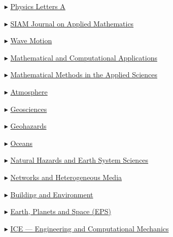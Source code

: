 \begin{itemize}
    \item[$\blacktriangleright$] \href{http://www.journals.elsevier.com/physics-letters-a/}{Physics Letters A}
    
    \item[$\blacktriangleright$] \href{http://www.siam.org/journals/siap.php}{SIAM Journal on Applied Mathematics}
  
    \item[$\blacktriangleright$] \href{http://www.elsevier.com/locate/wavemoti}%
    {Wave Motion}
    
    \item[$\blacktriangleright$] \href{https://www.mdpi.com/journal/mca}{Mathematical and Computational Applications}
    
    \item[$\blacktriangleright$] \href{https://onlinelibrary.wiley.com/journal/10991476/}{Mathematical Methods in the Applied Sciences}

    \item[$\blacktriangleright$] \href{https://www.mdpi.com/journal/atmosphere/}{Atmosphere}
    
    \item[$\blacktriangleright$] \href{https://www.mdpi.com/journal/geosciences/}{Geosciences}

    \item[$\blacktriangleright$] \href{https://www.mdpi.com/journal/geohazards/}{Geohazards}

    \item[$\blacktriangleright$] \href{https://www.mdpi.com/journal/oceans/}{Oceans}
    
    \item[$\blacktriangleright$] \href{http://www.nat-hazards-earth-syst-sci.net/}%
    {Natural Hazards and Earth System Sciences}

    \item[$\blacktriangleright$] \href{https://www.aimspress.com/journal/nhm/}{Networks and Heterogeneous Media}

    \item[$\blacktriangleright$] \href{https://www.sciencedirect.com/journal/building-and-environment}%
    {Building and Environment}
    
    \item[$\blacktriangleright$] \href{http://www.terrapub.co.jp/journals/EPS/}{Earth, Planets and Space (EPS)}
    
    \item[$\blacktriangleright$] \href{http://www.icevirtuallibrary.com/content/serial/eacm/}{ICE --- Engineering and Computational Mechanics}
    

\end{itemize}
